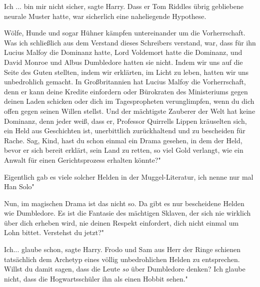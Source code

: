 \glqq Ich ... bin mir nicht sicher\grqq{}, sagte Harry. Dass er Tom Riddles
übrig gebliebene neurale Muster hatte, war sicherlich eine naheliegende
Hypothese.

\glqq Wölfe, Hunde und sogar Hühner kämpfen untereinander um die Vorherrschaft.
Was ich schließlich aus dem Verstand dieses Schreibers verstand, war, dass für
ihn Lucius Malfoy die Dominanz hatte, Lord Voldemort hatte die Dominanz, und
David Monroe und Albus Dumbledore hatten sie nicht. Indem wir uns auf die Seite
des Guten stellten, indem wir erklärten, im Licht zu leben, hatten wir uns
unbedrohlich gemacht. In Großbritannien hat Lucius Malfoy die Vorherrschaft,
denn er kann deine Kredite einfordern oder Bürokraten des Ministeriums gegen
deinen Laden schicken oder dich im Tagespropheten verunglimpfen, wenn du dich
offen gegen seinen Willen stellst. Und der mächtigste Zauberer der Welt hat
keine Dominanz, denn jeder weiß, dass er\grqq{}, Professor Quirrells Lippen
kräuselten sich, \glqq ein Held aus Geschichten ist, unerbittlich zurückhaltend
und zu bescheiden für Rache. Sag, Kind, hast du schon einmal ein Drama gesehen,
in dem der Held, bevor er sich bereit erklärt, sein Land zu retten, so viel Gold
verlangt, wie ein Anwalt für einen Gerichtsprozess erhalten könnte?"

\glqq Eigentlich gab es viele solcher Helden in der Muggel-Literatur, ich nenne
nur mal Han Solo"

\glqq Nun, im magischen Drama ist das nicht so. Da gibt es nur bescheidene
Helden wie Dumbledore. Es ist die Fantasie des mächtigen Sklaven, der sich nie
wirklich über dich erheben wird, nie deinen Respekt einfordert, dich nicht
einmal um Lohn bittet. Verstehst du jetzt?"

\glqq Ich... glaube schon\grqq{}, sagte Harry. Frodo und Sam aus Herr der Ringe
schienen tatsächlich dem Archetyp eines völlig unbedrohlichen Helden zu
entsprechen. \glqq Willst du damit sagen, dass die Leute \emph{so} über
Dumbledore denken? Ich glaube nicht, dass die Hogwartsschüler ihn als einen
Hobbit sehen."

